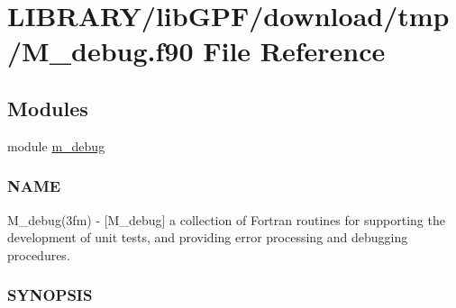 \hypertarget{M__debug_8f90}{}\section{L\+I\+B\+R\+A\+R\+Y/lib\+G\+P\+F/download/tmp/\+M\+\_\+debug.f90 File Reference}
\label{M__debug_8f90}
\subsection*{Modules}
\begin{DoxyCompactItemize}
\item 
module \hyperlink{namespacem__debug}{m\+\_\+debug}
\begin{DoxyCompactList}\small\item\em \subsubsection*{N\+A\+ME}

M\+\_\+debug(3fm) -\/ \mbox{[}M\+\_\+debug\mbox{]} a collection of Fortran routines for supporting the development of unit tests, and providing error processing and debugging procedures. \subsubsection*{S\+Y\+N\+O\+P\+S\+IS}\end{DoxyCompactList}\end{DoxyCompactItemize}
